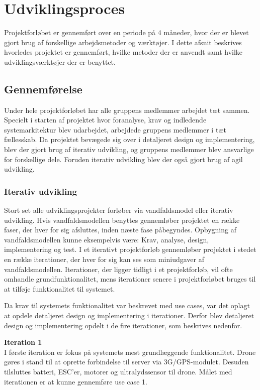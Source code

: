 \section{Udviklingsproces}
Projektforløbet er gennemført over en periode på 4 måneder, hvor der er blevet gjort brug af forskellige arbejdsmetoder og værktøjer. I dette afsnit beskrives hvorledes projektet er gennemført, hvilke metoder der er anvendt samt hvilke udviklingsværktøjer der er benyttet.

\subsection{Gennemførelse}
Under hele projektforløbet har alle gruppens medlemmer arbejdet tæt sammen. Specielt i starten af projektet hvor foranalyse, krav og indledende systemarkitektur blev udarbejdet, arbejdede gruppens medlemmer i tæt fællesskab. 
Da projektet bevægede sig over i detaljeret design og implementering, blev der gjort brug af iterativ udvikling, og gruppens medlemmer blev ansvarlige for forskellige dele. Foruden iterativ udvikling blev der også gjort brug af agil udvikling.


\subsubsection*{Iterativ udvikling}
Stort set alle udviklingsprojekter forløber via vandfaldsmodel eller iterativ udvikling. 
Hvis vandfaldsmodellen benyttes gennemløber projektet en række faser, der hver for sig afsluttes, inden næste fase påbegyndes. Opbygning af vandfaldsmodellen kunne eksempelvis være: Krav, analyse, design, implementering og test.
I et iterativt projektforløb gennemløber projektet i stedet en række iterationer, der hver for sig kan ses som miniudgaver af vandfaldsmodellen. Iterationer, der ligger tidligt i et projektforløb, vil ofte omhandle grundfunktionalitet, mens iterationer senere i projektforløbet bruges til at tilføje funktionalitet til systemet. 

\newpage 

Da krav til systemets funktionalitet var beskrevet med use cases, var det oplagt at opdele detaljeret design og implementering  i iterationer. Derfor blev detaljeret design og implementering opdelt i de fire iterationer, som beskrives nedenfor.  

\textbf{Iteration 1}\\
I første iteration er fokus på systemets mest grundlæggende funktionalitet. 
Drone gøres i stand til at oprette forbindelse til server via 3G/GPS-modulet.
Desuden tilsluttes batteri, ESC'er, motorer og ultralydssensor til drone. 
Målet med iterationen er at kunne gennemføre use case 1. 

